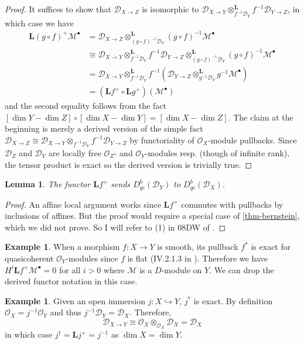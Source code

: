 \documentclass[11pt, a4paper]{article}
\newtheorem{lemma}[theorem]{Lemma}
\theoremstyle{definition}
\newtheorem{example}[theorem]{Example}
\newcommand{\dL}{\mathbf{L}}
\begin{document}
    \begin{proof}
        It suffices to show that $\mathcal D_{X\to Z}$ is isomorphic to $\mathcal D_{X\to Y}\otimes^{\dL}_{f^{-1}\mathcal D_Y}f^{-1}\mathcal D_{Y\to Z}$, in which case we have
        \begin{align*}
            \dL (g\circ f)^+\mathcal M^\bullet
            &=\mathcal D_{X\to Z}\otimes_{(g\circ f)^{-1}\mathcal D_Y}^\dL (g\circ f)^{-1}\mathcal M^\bullet\\
            &\cong \mathcal D_{X\to Y}\otimes^{\dL}_{f^{-1}\mathcal D_Y}f^{-1}\mathcal D_{Y\to Z}\otimes_{(g\circ f)^{-1}\mathcal D_Y}^\dL (g\circ f)^{-1}\mathcal M^\bullet\\
            &= \mathcal D_{X\to Y}\otimes^{\dL}_{f^{-1}\mathcal D_Y}f^{-1}(\mathcal D_{Y\to Z}\otimes_{g^{-1}\mathcal D_Y}^\dL g^{-1}\mathcal M^\bullet)\\
            &=(\dL f^+\circ\dL g^+)(\mathcal M^\bullet)
        \end{align*}
        and the second equality follows from the fact $[\dim Y-\dim Z]\circ [\dim X-\dim Y]=[\dim X-\dim Z]$. The claim at the beginning is merely a derived version of the simple fact $\mathcal D_{X\to Z}\cong\mathcal D_{X\to Y}\otimes_{f^{-1}\mathcal D_Y}f^{-1}\mathcal D_{Y\to Z}$ by functoriality of $\mathcal O_X$-module pullbacks. Since $\mathcal D_Z$ and $\mathcal D_Y$ are locally free $\mathcal O_Z$- and $\mathcal O_Y$-modules resp. (though of infinite rank), the tensor product is exact so the derived version is trivially true.
    \end{proof}
    \begin{lemma}
        The functor $\dL f^+$ sends $D^b_{qc}(\mathcal D_Y)$ to $D^b_{qc}(\mathcal D_X)$.
    \end{lemma}
    \begin{proof}
        An affine local argument works since $\dL f^+$ commutes with pullbacks by inclusions of affines. But the proof would require a special case of \cref{thm-bernstein}, which we did not prove. So I will refer to (1) in 08DW of \cite{stacks-project}.
    \end{proof}
    \begin{example}
        When a morphism $f:X\to Y$ is smooth, its pullback $f^*$ is exact for quasicoherent $\mathcal O_Y$-modules since $f$ is flat (IV.2.1.3 in \cite{ega}). Therefore we have $H^i\dL f^+\mathcal M^\bullet=0$ for all $i>0$ where $\mathcal M$ is a $D$-module on $Y$. We can drop the derived functor notation in this case.
    \end{example}
    \begin{example}
        Given an open immersion $j:X\hookrightarrow Y$, $j^*$ is exact. By definition $\mathcal O_X=j^{-1}\mathcal O_Y$ and thus $j^{-1}\mathcal D_Y=\mathcal D_X$. Therefore,
        \[\mathcal D_{X\to Y}\cong\mathcal O_X\otimes_{\mathcal O_X}\mathcal D_X=\mathcal D_X\]
        in which case $j^\dagger=\dL j^+=j^{-1}$ as $\dim X=\dim Y$.
    \end{example}
\end{document}
